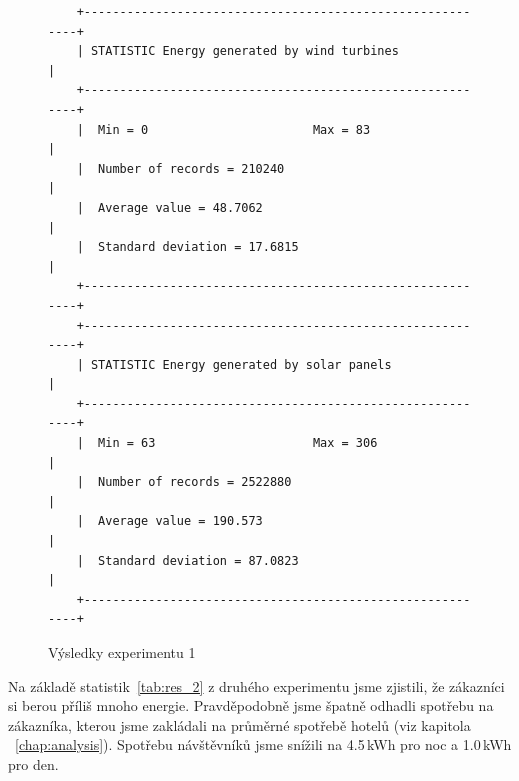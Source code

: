 \begin{figure}[H]
    \begin{verbatim}
    +----------------------------------------------------------+
    | STATISTIC Energy generated by wind turbines              |
    +----------------------------------------------------------+
    |  Min = 0                       Max = 83                  |
    |  Number of records = 210240                              |
    |  Average value = 48.7062                                 |
    |  Standard deviation = 17.6815                            |
    +----------------------------------------------------------+
    +----------------------------------------------------------+
    | STATISTIC Energy generated by solar panels               |
    +----------------------------------------------------------+
    |  Min = 63                      Max = 306                 |
    |  Number of records = 2522880                             |
    |  Average value = 190.573                                 |
    |  Standard deviation = 87.0823                            |
    +----------------------------------------------------------+
    \end{verbatim}
    \caption{Výsledky experimentu 1}
    \label{tab:res_1}
\end{figure}

Na základě statistik~\ref{tab:res_2} z druhého experimentu jsme zjistili, že zákazníci si berou příliš mnoho energie. Pravděpodobně jsme špatně odhadli spotřebu na zákazníka, kterou jsme zakládali na průměrné spotřebě hotelů (viz kapitola ~\ref{chap:analysis}). Spotřebu návštěvníků jsme snížili na 4.5\,kWh pro noc a 1.0\,kWh pro den.

